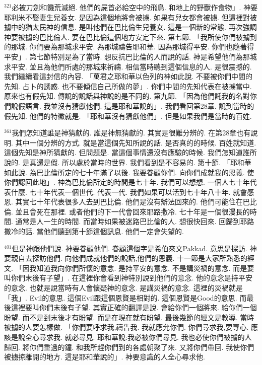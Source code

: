 \documentclass{book}
\begin{document}
$^{321}$必被刀劍和饑荒滅絕.
他們的屍首必給空中的飛鳥.
和地上的野獸作食物」.
神要耶利米不娶妻生兒養女.
是因為這個地將會被擄.
如果有兒女都會被擄.
但這裡對被擄中的猶太民神的信息.
是叫他們在巴比倫生兒養女.
這是一個新的常態.
再次強調神要被擄的巴比倫人.
要在巴比倫這個地方安定下來.
第七節.
「我所使你們被擄到的那城.
你們要為那城求平安.
為那城禱告耶和華.
因為那城得平安.
你們也隨著得平安」.
第七節特別是為了當時.
想反抗巴比倫的人而說的話.
神是希望他們為那城求平安.
並且為他們所處的那城來祈禱.
相信當時聽到這個信息的人.
是很震撼的.
我們繼續看這封信的內容.
「萬君之耶和華以色列的神如此說.
不要被你們中間的先知.
占卜的誘惑.
也不要傾信自己所做的夢」.
你們中間的先知代表在被擄當中.
原來也有假先知.
傳說的說話與神說的是不同的.
第九節.
「因為他們託我的名對你們說假語言.
我並沒有猜獻他們.
這是耶和華說的」.
我們看回第28章.
說到當時的假先知.
他們的特徵就是.
「耶和華沒有猜獻他們」.
但是如果我們是當時的百姓.

$^{361}$我們怎知道誰是神猜獻的.
誰是神無猜獻的.
其實是很難分辨的.
在第28章也有說明.
其中一個分辨的方式.
就是當這個先知所說的話.
是否真的的時候.
百姓就知道.
這個先知是神所猜獻的.
但問題是.
當這個事情還沒有應驗的時候.
我們怎知道誰所說的.
是真還是假.
所以處於當時的世界.
我們看到是不容易的.
第十節.
「耶和華如此說.
為巴比倫所定的七十年滿了以後.
我要眷顧你們.
向你們成就我的恩義.
使你們認回此地」.
神為巴比倫所定的時間是七十年.
我們可以想想.
一個人七十年代表什麼.
七十年代表一個世代.
代表一代.
我們如果可以活到七十年八十年.
就會感恩.
其實七十年代表很多人去到巴比倫.
他們是沒有辦法回來的.
他們可能住在巴比倫.
並且會死在那裡.
或者他們的下一代會回來耶路撒冷.
七十年是一個很漫長的時間.
通常是人一生的時間.
而當時如果被迷路巴比倫的人.
想很快回來.
回歸到耶路撒冷的話.
當他們聽到第十節這個訊息.
他們一定會失望的.

$^{401}$但是神跟他們說.
神要眷顧他們.
眷顧這個字是希伯來文Pakkad.
意思是探訪.
神要親自去探訪他們.
向他們成就他們的說話,他們的恩義.
十一節是大家所熟悉的經文.
「因我知道我向你們所懷的意念.
是持平安的意念.
不是講災禍的意念.
而是要叫你們末後有子望」.
在這裡你會看到神特別說到他們的意念.
他的意念是持平安的意念.
也就是說當時有人會懷疑神的意念.
是講災禍的意念.
這裡的災禍就是「我」.
Evil的意思.
這個Evil跟這個恩賢是相對的.
這個恩賢是Good的意思.
而最後這裡要叫你們末後有子望.
其實正確的翻譯是說.
會給你們一個將來.
給你們一個盼望.
而不是到末後才有盼望.
而是在現在就有盼望.
最後幾節的經文是教導.
當時被擄的人要怎樣做.
「你們要呼求我,禱告我.
我就應允你們.
你們尋求我,要專心.
應該是說全心尋求我.
就必尋見.
耶和華說:我必被你們尋見.
我也必使你們被擄的人歸回.
將你們重過的鐘.
和我所趕你們到的各處朝聚了來.
又將你們帶回.
我使你們被擄掠離開的地方.
這是耶和華說的」.
神要意識的人全心尋求他.
\end{document}
